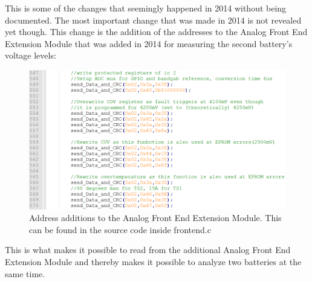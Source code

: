 This is some of the changes that seemingly happened in 2014 without being documented. The most important change that was made in 2014 is not revealed yet though. This change is the addition of the addresses to the Analog Front End Extension Module that was added in 2014 for measuring the second battery's voltage levels:\\
\begin{figure}[H]
	\centering
	\includegraphics[width=1.0\linewidth]{Software/AddressAdditionsBMS.PNG}
	\caption{Address additions to the Analog Front End Extension Module. This can be found in the source code inside frontend.c}
	\label{fig:AddressAdditions_BMS}
\end{figure}

This is what makes it possible to read from the additional Analog Front End Extension Module and thereby makes it possible to analyze two batteries at the same time.



